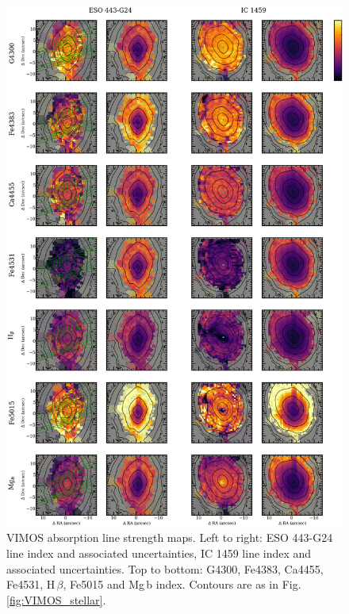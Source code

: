 		\begin{figure}
			\centering
			\includegraphics[height=0.89\textheight]{chapter4/vimos/abs1.png}
			\caption[VIMOS absorption line strength maps]{VIMOS absorption line strength maps. Left to right: ESO 443-G24 line index and associated uncertainties, IC 1459 line index and associated uncertainties. Top to bottom: G4300, Fe4383, Ca4455, Fe4531, H\,$\beta$, Fe5015 and Mg\,b index. Contours are as in Fig.\,\ref{fig:VIMOS_stellar}.}%
			\label{fig:VIMOS_absorption}
		\end{figure}
